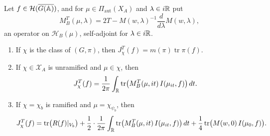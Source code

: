 \begin{theorem}\label{thm:Jchi}
Let $f\in\mathcal H(\overline{G(\mathbb{A})})$, and for $\mu\in\Pi_{\mathrm{aut}}(X_A)$ and
$\lambda\in i\mathbb{R}$ put
\begin{equation}\label{eq:MT}
M_B^T(\mu,\lambda)=2T-M(w,\lambda)^{-1}\frac{d}{d\lambda}M(w,\lambda),
\end{equation}
an operator on $\mathcal H_B(\mu)$, self-adjoint for $\lambda\in i\mathbb{R}$.
\begin{enumerate}[label=(\alph*)]
\item If $\chi$ is the class of $(G,\pi)$, then $J^T_\chi(f)=
  m(\pi)\operatorname{tr}\pi(f)$.
\item If $\chi\in\mathcal X_A$ is unramified and $\mu\in\chi$, then
  \[
  J^T_\chi(f)=\frac1{2\pi}\int_{\mathbb{R}}\operatorname{tr}\bigl(M_B^T(\mu,it)\,
  I(\mu_{it},f)\bigr)\,dt .
  \]
\item If $\chi=\chi_b$ is ramified and $\mu=\chi_{\psi_b}$, then
  \[
  J^T_\chi(f)=\operatorname{tr}\bigl(R(f)|_{V_b}\bigr)
  +\frac12\cdot\frac1{2\pi}\int_{\mathbb{R}}\operatorname{tr}\bigl(M_B^T(\mu,it)\,
  I(\mu_{it},f)\bigr)\,dt
  +\frac14\operatorname{tr}\bigl(M(w,0)\,I(\mu_0,f)\bigr).
  \]
\end{enumerate}
\end{theorem}

